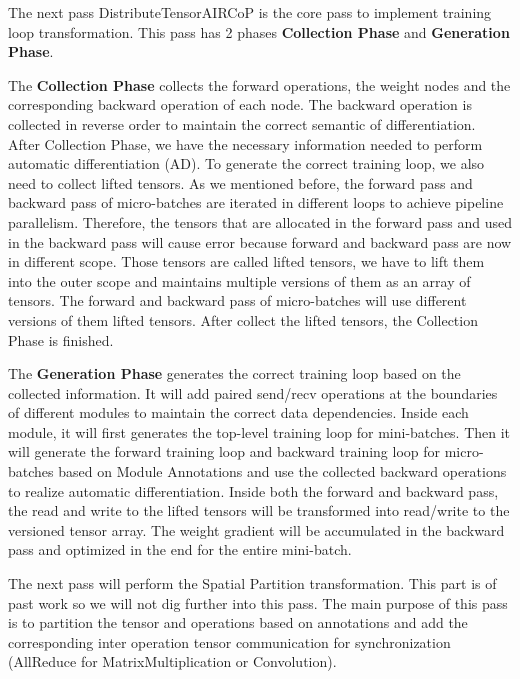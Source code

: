 \documentclass[sigplan]{acmart}\settopmatter{printfolios=true,printccs=false,printacmref=false}
\begin{document}
The next pass DistributeTensorAIRCoP is the core pass to implement training loop transformation. This pass has 2 phases \textbf{Collection Phase} and \textbf{Generation Phase}.\par
 The \textbf{Collection Phase} collects the forward operations, the weight nodes and the corresponding backward operation of each node. The backward operation is collected in reverse order to maintain the correct semantic of differentiation. After Collection Phase, we have the necessary information needed to perform automatic differentiation (AD). To generate the correct training loop, we also need to collect lifted tensors. As we mentioned before, the forward pass and backward pass of micro-batches are iterated in different loops to achieve pipeline parallelism. Therefore, the tensors that are allocated in the forward pass and used in the backward pass will cause error because forward and backward pass are now in different scope. Those tensors are called lifted tensors, we have to lift them into the outer scope and maintains multiple versions of them as an array of tensors. The forward and backward pass of micro-batches will use different versions of them lifted tensors. After collect the lifted tensors, the Collection Phase is finished.\par
 The \textbf{Generation Phase} generates the correct training loop based on the collected information. It will add paired send/recv operations at the boundaries of different modules to maintain the correct data dependencies. Inside each module, it will first generates the top-level training loop for mini-batches. Then it will generate the forward training loop and backward training loop for micro-batches based on Module Annotations and use the collected backward operations to realize automatic differentiation. Inside both the forward and backward pass, the read and write to the lifted tensors will be transformed into read/write to the versioned tensor array. The weight gradient will be accumulated in the backward pass and optimized in the end for the entire mini-batch.\par
 The next pass will perform the Spatial Partition transformation. This part is of past work so we will not dig further into this pass. The main purpose of this pass is to partition the tensor and operations based on annotations and add the corresponding inter operation tensor communication for synchronization (AllReduce for MatrixMultiplication or Convolution).\par
\end{document}
